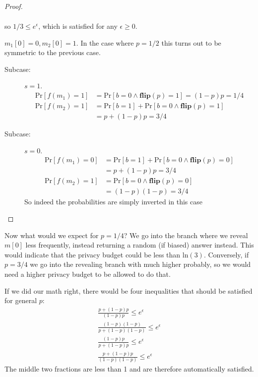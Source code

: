 \documentclass[11pt]{article}
\newcommand{\pr}{\mathrm{Pr}}
\newcommand{\flip}{\mathbf{flip}}
\begin{document}
\begin{proof}
\begin{description}
\begin{description}
\[\begin{array}{ll}
      \end{array}
    \]
    so $1/3 \leq e^\epsilon$, which is satisfied for any $\epsilon \geq 0$.
  \end{description}
\item[Case:] $m_1[0] = 0, m_2[0] = 1$.  In the case where $p = 1/2$ this turns
  out to be symmetric to the previous case.
  \begin{description}
  \item[Subcase:] $s = 1$.
    \[
      \begin{array}{ll}
        \pr[f(m_1) = 1]
        &= \pr[b = 0 \land \flip(p) = 1] = (1-p)p  = 1/4 \\
        \pr[f(m_2) = 1]
        &= \pr[b = 1] + \pr[b = 0 \land \flip(p) = 1] \\
        &= p + (1-p)p  = 3/4
      \end{array}
    \]
  \item[Subcase:] $s = 0$.
    \[
      \begin{array}{ll}
        \pr[f(m_1) = 0]
        &= \pr[b = 1] + \pr[b = 0 \land \flip(p) = 0] \\
        &= p + (1-p)p  = 3/4 \\
        \pr[f(m_2) = 1]
        &= \mathrm{Pr}[b = 0 \land \flip(p) = 0] \\
        &= (1-p)(1-p)  = 3/4
      \end{array}
    \]
    So indeed the probabilities are simply inverted in this case
  \end{description}
\end{description}
\end{proof}

Now what would we expect for $p = 1/4$?  We go into the branch where we reveal
$m[0]$ less frequently, instead returning a random (if biased) answer instead.
This would indicate that the privacy budget could be less than $\mathrm{ln}(3)$.
Conversely, if $p = 3/4$ we go into the revealing branch with much higher
probably, so we would need a higher privacy budget to be allowed to do that.

If we did our math right, there would be four inequalities that
should be satisfied for general $p$:
\newcommand{\ffrac}[2]{\frac{\displaystyle #1}{\displaystyle #2}}
\[\renewcommand{\arraystretch}{2}
  \begin{array}{lcl}
    \ffrac{p + (1-p)p}{(1-p)p} \leq e^\epsilon \\
    \ffrac{(1-p)(1-p)}{p+(1-p)(1-p)} \leq e^\epsilon \\
    \ffrac{(1-p)p}{p+(1-p)p} \leq e^\epsilon \\
    \ffrac{p+(1-p)p}{(1-p)(1-p)} \leq e^\epsilon
  \end{array}
\]
The middle two fractions are less than 1 and are therefore automatically
satisfied.
\end{document}

